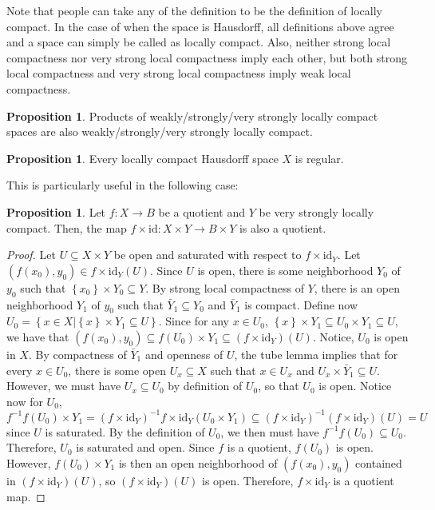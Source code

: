\documentclass[12pt,reqno]{amsart}
\numberwithin{theorem}{section}
\theoremstyle{definition}
\theoremstyle{remark}
\numberwithin{equation}{section}
\newcommand{\set}[1]{\left \{ #1 \right \}}
\theoremstyle{definition}
\newtheorem{prop}[theorem]{Proposition}
\newcommand{\id}{\mathrm{id}}
\begin{document}
Note that people can take any of the definition to be the definition of locally compact. In the case of when the space is Hausdorff, all definitions above agree and a space can simply be called as locally compact. Also, neither strong local compactness nor very strong local compactness imply each other, but both strong local compactness and very strong local compactness imply weak local compactness. 
\begin{prop}
    Products of weakly/strongly/very strongly locally compact spaces are also weakly/strongly/very strongly locally compact.
\end{prop}
\begin{prop}\label{prop1}
    Every locally compact Hausdorff space $X$ is regular. 
\end{prop}
This is particularly useful in the following case:
\begin{prop}
    Let $f:X\rightarrow B$ be a quotient and $Y$ be very strongly locally compact. Then, the map $f\times \id : X\times Y\rightarrow B\times Y$ is also a quotient.
\end{prop}
\begin{proof}
     Let $U \subseteq X\times Y$ be open and saturated with respect to $f\times \id_Y$. Let $(f(x_0),y_0) \in f \times \id_Y(U)$. Since $U$ is open, there is some neighborhood $Y_0$ of $y_0$ such that $\set{x_0} \times Y_0 \subseteq Y$. By strong local compactness of $Y$, there is an open neighborhood $Y_1$ of $y_0$ such that $\bar Y_1\subseteq Y_0$ and $\bar Y_1$ is compact. Define now $U_0 = \set{x \in X|\set{x} \times Y_1 \subseteq U}$. Since for any $x \in U_0$, $\set{x}\times Y_1 \subseteq U_0\times Y_1 \subseteq U$, we have that $(f(x_0),y_0) \subseteq f(U_0) \times Y_1 \subseteq (f\times \id_Y)(U)$. Notice, $U_0$ is open in $X$. By compactness of $\bar Y_1$ and openness of $U$, the tube lemma implies that for every $x \in U_0$, there is some open $U_x \subseteq X$ such that $x \in U_x$ and $U_x \times \bar Y_1 \subseteq U$. However, we must have $U_x \subseteq U_0$ by definition of $U_0$, so that $U_0$ is open. Notice now for $U_0$, $$f^{-1}f(U_0) \times Y_1 = (f\times \id_Y)^{-1}f\times \id_Y(U_0 \times Y_1) \subseteq (f\times \id_Y)^{-1}(f\times \id_Y)(U) = U$$
    since $U$ is saturated. By the definition of $U_0$, we then must have $f^{-1}f(U_0) \subseteq U_0$. Therefore, $U_0$ is saturated and open. Since $f$ is a quotient, $f(U_0)$ is open. However, $f(U_0)\times Y_1$ is then an open neighborhood of $(f(x_0),y_0)$ contained in $(f\times \id_Y)(U)$, so $(f\times \id_Y)(U)$ is open. Therefore, $f\times \id_Y$ is a quotient map.
\end{proof}
\end{document}

